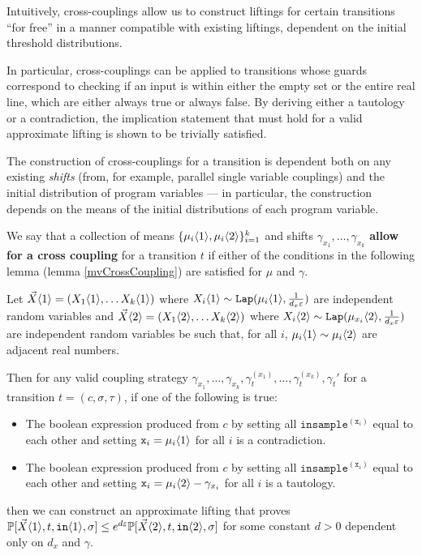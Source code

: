 Intuitively, cross-couplings allow us to construct liftings for certain transitions ``for free'' in a manner compatible with existing liftings, dependent on the initial threshold distributions. 

In particular, cross-couplings can be applied to transitions whose guards correspond to checking if an input is within either the empty set or the entire real line, which are either always true or always false. By deriving either a tautology or a contradiction, the implication statement that must hold for a valid approximate lifting is shown to be trivially satisfied. 

The construction of cross-couplings for a transition is dependent both on any existing \textit{shifts} (from, for example, parallel single variable couplings) and the initial distribution of program variables --- in particular, the construction depends on the means of the initial distributions of each program variable. 

We say that a collection of means $\{\mu_i\langle1 \rangle, \mu_i\langle2 \rangle\}_{i=1}^k$ and shifts $\gamma_{x_1},\ldots,\gamma_{x_k}$ \textbf{allow for a cross coupling} for a transition $t$ if either of the conditions in the following lemma (lemma \ref{mvCrossCoupling}) are satisfied for $\mu$ and $\gamma$. 

\begin{lemma}\label{mvCrossCoupling}
    Let $\vec{X}\langle1 \rangle = (X_1\langle1 \rangle, \ldots X_k\langle1 \rangle)$ where $X_i\langle1 \rangle\sim \texttt{Lap}(\mu_i\langle1 \rangle, \frac{1}{d_x\varepsilon})$ are independent random variables and $\vec{X}\langle2 \rangle = (X_1\langle2 \rangle, \ldots X_k\langle2 \rangle)$ where $X_i\langle2 \rangle\sim \texttt{Lap}(\mu_{x_i}\langle2 \rangle, \frac{1}{d_x\varepsilon})$ 
    are independent random variables be such that, for all $i$, $\mu_i\langle1 \rangle\sim \mu_i\langle2 \rangle$ are adjacent real numbers.

    Then for any valid coupling strategy $\gamma_{x_1}, \ldots, \gamma_{x_k}, \gamma_t^{(x_1)}, \ldots, \gamma_t^{(x_k)}, \gamma_t'$ for a transition $t = (c, \sigma,\tau)$, if one of the following is true: \begin{itemize}
        \item The boolean expression produced from $c$ by setting all $\texttt{insample}^{(\texttt{x}_i)}$ equal to each other and setting $\texttt{x}_i = \mu_i\langle1 \rangle$ for all $i$ is a contradiction.
        \item The boolean expression produced from $c$ by setting all $\texttt{insample}^{(\texttt{x}_i)}$ equal to each other and setting $\texttt{x}_i = \mu_i\langle2 \rangle-\gamma_{x_i}$ for all $i$ is a tautology.
    \end{itemize}
    then we can construct an approximate lifting that proves $\mathbb{P}[\vec{X}\langle1 \rangle, t, \texttt{in}\langle1 \rangle, \sigma]\leq e^{d\varepsilon}\mathbb{P}[\vec{X}\langle2 \rangle, t, \texttt{in}\langle2 \rangle, \sigma]$ for some constant $d>0$ dependent only on $d_x$ and $\gamma$. 
\end{lemma}


